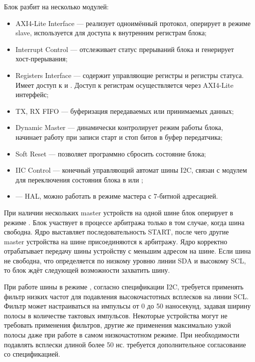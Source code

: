 Блок разбит на несколько модулей:
\begin{itemize}
  \item AXI4-Lite Interface --- реализует одноимённый протокол, оперирует в режиме slave, используется
    для доступа к внутренним регистрам блока;
  \item Interrupt Control --- отслеживает статус прерываний блока и генерирует хост-прерывания;
  \item Registers Interface --- содержит управляющие регистры и регистры статуса. Имеет доступ к
     и . Доступ к регистрам осуществляется через AXI4-Lite интерфейс;
  \item TX, RX FIFO --- буферизация передаваемых или принимаемых данных;
  \item Dynamic Master --- динамически контролирует режим работы блока, начинает работу при записи
    старт и стоп битов в буфер передатчика;
  \item Soft Reset --- позволяет программно сбросить состояние блока;
  \item IIC Control --- конечный управляющий автомат шины I2C, связан с модулем  для
    переключения состояния блока в  или ;
  \item {} --- HAL, можно работать в режиме мастера с 7-битной адресацией.
\end{itemize}

При наличии нескольких master устройств на одной шине блок оперирует в режиме .
Блок участвует в процессе арбитража только в том случае, когда шина свободна. Ядро
выставляет последовательность START, после чего другие master устройства на шине
присоединяются к арбитражу. Ядро корректно отрабатывает передачу шины
устройству с меньшим адресом на шине. Если шина не свободна, что определяется
по низкому уровню линии SDA и высокому SCL, то блок ждёт следующей возможности
захватить шину.

При работе шины в режиме , согласно спецификации I2C, требуется применять
фильтр низких частот для подавления высокочастотных всплесков на линии SCL. Фильтр
может настраиваться на импульсы от 0 до 50 наносекунд, задавая ширину полосы
в количестве тактовых импульсов. Некоторые устройства могут не требовать применения фильтров,
другие же применения максимально узкой полосы даже при работе в самом низкочастотном режиме.
При необходимости подавлять всплески длиной более 50 нс. требуется дополнительное согласование
со спецификацией.

